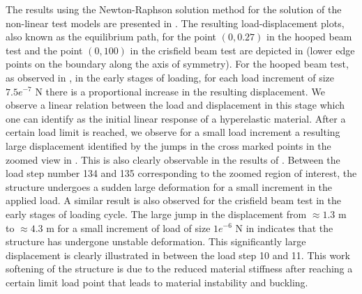 \documentclass[11pt,a4paper,final]{article}
\begin{document}
The results using the Newton-Raphson solution method for the solution of the non-linear test models are presented in . The resulting load-displacement plots, also known as the equilibrium path, for the point $(0, 0.27)$ in the hooped beam test and the point $(0, 100)$ in the crisfield beam test are depicted in  (lower edge points on the boundary along the axis of symmetry). For the hooped beam test, as observed in , in the early stages of loading, for each load increment of size $7.5e^{-7}$ N there is a proportional increase in the resulting displacement. We observe a linear relation between the load and displacement in this stage which one can identify as the initial linear response of a hyperelastic material. After a certain load limit is reached, we observe for a small load increment a resulting large displacement identified by the jumps in the cross marked points in the zoomed view in . This is also clearly observable in the results of . Between the load step number 134 and 135 corresponding to the zoomed region of interest, the structure undergoes a sudden large deformation for a small increment in the applied load. A similar result is also observed for the crisfield beam test in the early stages of loading cycle. The large jump in the displacement from $\approx 1.3$ m to $\approx 4.3$ m for a small increment of load of size $1e^{-6}$ N in  indicates that the structure has undergone unstable deformation. This significantly large displacement is clearly illustrated in  between the load step 10 and 11. This work softening of the structure is due to the reduced material stiffness after reaching a certain limit load point that leads to material instability and buckling. \par 
\end{document}
